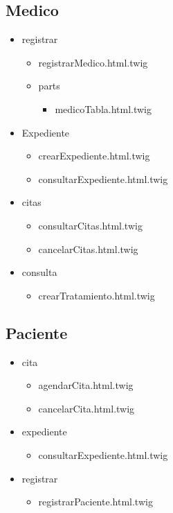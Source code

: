 		\subsection{Medico}
		\begin{itemize}
			\item registrar
			\begin{itemize}
			\item registrarMedico.html.twig
			\item parts
			\begin{itemize}
				\item medicoTabla.html.twig
			\end{itemize}
			\end{itemize}
			\item Expediente 
			\begin{itemize}
				\item crearExpediente.html.twig
				\item consultarExpediente.html.twig
			\end{itemize}
			\item citas
			\begin{itemize}
				\item consultarCitas.html.twig
				\item cancelarCitas.html.twig
			\end{itemize}
			\item consulta
			\begin{itemize}
				\item crearTratamiento.html.twig				
			\end{itemize}
		\end{itemize}
		\subsection{Paciente}
		\begin{itemize}
			\item cita
			\begin{itemize}
				\item agendarCita.html.twig
				\item cancelarCita.html.twig
			\end{itemize}
			\item expediente
			\begin{itemize}
				\item consultarExpediente.html.twig
			\end{itemize}
			\item registrar
			\begin{itemize}
			\item registrarPaciente.html.twig
			\end{itemize}
			
		\end{itemize}
